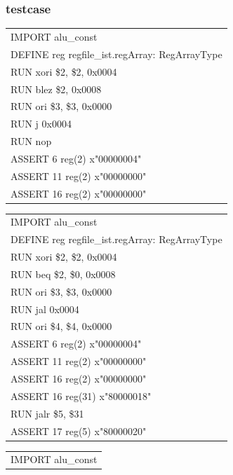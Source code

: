 \documentclass[11pt,utf8]{article}
\begin{document}
{{{\subsubsection{testcase} {
\begin{center}	\begin{longtable}{p{15cm}} \hline
		IMPORT{ }alu\_const\\
		DEFINE{ }reg{ }regfile\_ist.regArray:{ }RegArrayType\\
		RUN{ }xori{ }\$2,{ }\$2,{ }0x0004\\
		RUN{ }blez{ }\$2,{ }0x0008\\
		RUN{ }ori{ }\$3,{ }\$3,{ }0x0000\\
		RUN{ }j{ }0x0004\\
		RUN{ }nop\\
		ASSERT{ }6{ }reg(2){ }x"00000004"\\
		ASSERT{ }11{ }reg(2){ }x"00000000"\\
		ASSERT{ }16{ }reg(2){ }x"00000000"\\
		\hline \end{longtable} \end{center}
\begin{center}	\begin{longtable}{p{15cm}} \hline
		IMPORT{ }alu\_const\\
		DEFINE{ }reg{ }regfile\_ist.regArray:{ }RegArrayType\\
		RUN{ }xori{ }\$2,{ }\$2,{ }0x0004\\
		RUN{ }beq{ }\$2,{ }\$0,{ }0x0008\\
		RUN{ }ori{ }\$3,{ }\$3,{ }0x0000\\
		RUN{ }jal{ }0x0004\\
		RUN{ }ori{ }\$4,{ }\$4,{ }0x0000\\
		ASSERT{ }6{ }reg(2){ }x"00000004"\\
		ASSERT{ }11{ }reg(2){ }x"00000000"\\
		ASSERT{ }16{ }reg(2){ }x"00000000"\\
		ASSERT{ }16{ }reg(31){ }x"80000018"\\
		RUN{ }jalr{ }\$5,{ }\$31\\
		ASSERT{ }17{ }reg(5){ }x"80000020"\\
		\hline \end{longtable} \end{center}
\begin{center}	\begin{longtable}{p{15cm}} \hline
		IMPORT{ }alu\_const\\

\end{longtable}
\end{center}}}}}
\end{document}
